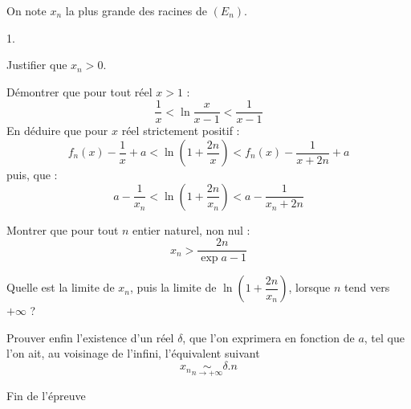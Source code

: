 \documentclass[11pt]{article}%
\begin{document}
On note $x_{n}$ la plus grande des racines de $(E_{n})$.

\begin{noliste}{1.}
 \setlength{\itemsep}{4mm}
\item Justifier que $x_{n}>0$.

\item Démontrer que pour tout réel $x>1$ : 
\[
\dfrac{1}{x}<\ln \dfrac{x}{x-1}<\dfrac{1}{x-1}
\]
En déduire que pour $x$ réel strictement positif : 
\[
f_{n}(x)-\dfrac{1}{x} + a<\ln (1 + \dfrac{2n}{x})<f_{n}(x)-\dfrac{1}{x
+ 2n} + a
\]
puis, que : 
\[
a-\dfrac{1}{x_{n}}<\ln \left( 1 + \dfrac{2n}{x_{n}}\right)
<a-\dfrac{1}{x_{n} + 2n}
\]

\item Montrer que pour tout $n$ entier naturel, non nul : 
\[
x_{n}>\dfrac{2n}{\exp a-1}
\]

\item Quelle est la limite de $x_{n}$, puis la limite de $\ln (1 +
\dfrac{2n}{x_{n}})$, lorsque $n$ tend vers $ + \infty $ ?

\item Prouver enfin l'existence d'un réel $\delta $, que l'on exprimera
en
fonction de $a$, tel que l'on ait, au voisinage de l'infini,
l'équivalent
suivant
\[
x_{n}\underset{n\rightarrow + \infty }{\sim }\delta.n
\]

\end{noliste}

\begin{center}
Fin de l'épreuve \label{fin}
\end{center}
\end{document}
